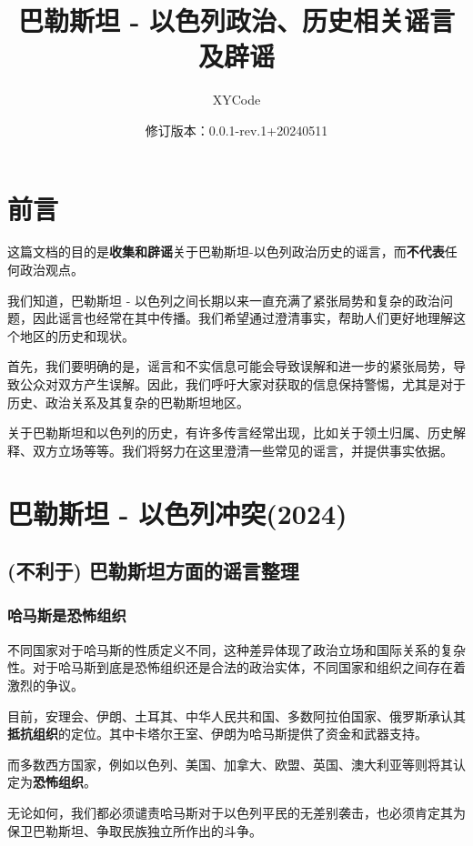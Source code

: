 \documentclass[UTF8]{ctexart}
\title{\textbf{巴勒斯坦 - 以色列政治、历史相关谣言及辟谣}}
\author{XYCode}
\date{修订版本：0.0.1-rev.1+20240511}
\begin{document}
    \maketitle

    \tableofcontents

    \section*{前言}
        这篇文档的目的是\textbf{收集和辟谣}关于巴勒斯坦-以色列政治历史的谣言，而\textbf{不代表}任何政治观点。
        
        我们知道，巴勒斯坦 - 以色列之间长期以来一直充满了紧张局势和复杂的政治问题，因此谣言也经常在其中传播。我们希望通过澄清事实，帮助人们更好地理解这个地区的历史和现状。

        首先，我们要明确的是，谣言和不实信息可能会导致误解和进一步的紧张局势，导致公众对双方产生误解。因此，我们呼吁大家对获取的信息保持警惕，尤其是对于历史、政治关系及其复杂的巴勒斯坦地区。

        关于巴勒斯坦和以色列的历史，有许多传言经常出现，比如关于领土归属、历史解释、双方立场等等。我们将努力在这里澄清一些常见的谣言，并提供事实依据。
    
    \section{巴勒斯坦 - 以色列冲突(2024)}
        \subsection{(不利于) 巴勒斯坦方面的谣言整理}
            \subsubsection{哈马斯是恐怖组织}
                不同国家对于哈马斯的性质定义不同，这种差异体现了政治立场和国际关系的复杂性。对于哈马斯到底是恐怖组织还是合法的政治实体，不同国家和组织之间存在着激烈的争议。

                目前，安理会、伊朗、土耳其、中华人民共和国、多数阿拉伯国家、俄罗斯承认其\textbf{抵抗组织}的定位。其中卡塔尔王室、伊朗为哈马斯提供了资金和武器支持。\cite{wiki:哈马斯}

                而多数西方国家，例如以色列、美国、加拿大、欧盟、英国、澳大利亚等则将其认定为\textbf{恐怖组织}。\cite{wiki:哈马斯}

                无论如何，我们都必须谴责哈马斯对于以色列平民的无差别袭击，也必须肯定其为保卫巴勒斯坦、争取民族独立所作出的斗争。
            
\end{document}
